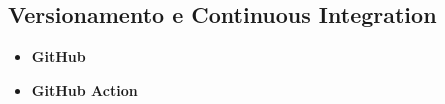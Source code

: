 \subsection{Versionamento e Continuous Integration}

\begin{itemize}
	\item \textbf{GitHub}
	\item \textbf{GitHub Action}
\end{itemize}
